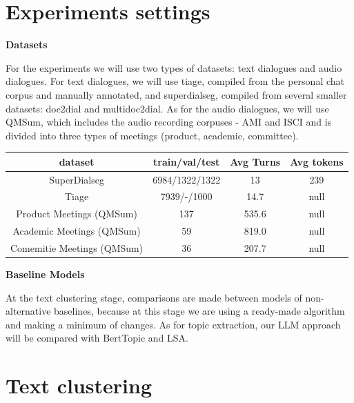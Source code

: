 \documentclass[PMI,VKR]{HSEUniversity}
\begin{document}
\section{Experiments settings}

\textbf{Datasets}

For the experiments we will use two types of datasets: text dialogues and audio dialogues. 
For text dialogues, we will use tiage, compiled from the personal chat corpus and manually annotated, and superdialseg, compiled from several smaller datasets: doc2dial and multidoc2dial. 
As for the audio dialogues, we will use QMSum, which includes the audio recording corpuses - AMI and ISCI and is divided into three types of meetings (product, academic, committee). \\

\begin{table}[htb]
    \begin{center}
        \begin{tabular}{ | c | c | c | c |} 
            \hline
            dataset & train/val/test & Avg Turns & Avg tokens \\ 
            \hline
            SuperDialseg & 6984/1322/1322 & 13 & 239 \\ 
            Tiage &  7939/-/1000 & 14.7  & null \\ 
            Product Meetings (QMSum) & 137 & 535.6 & null \\ 
            Academic Meetings (QMSum) & 59 & 819.0 & null \\ 
            Comemitie Meetings (QMSum) & 36 & 207.7 & null \\
            \hline
        \end{tabular}
    \end{center}
\end{table}



\textbf{Baseline Models}

At the text clustering stage, comparisons are made between models of non-alternative baselines, 
because at this stage we are using a ready-made algorithm and making a minimum of changes.
As for topic extraction, our LLM approach will be compared with BertTopic and LSA. \\

\section{Text clustering}
\end{document}
